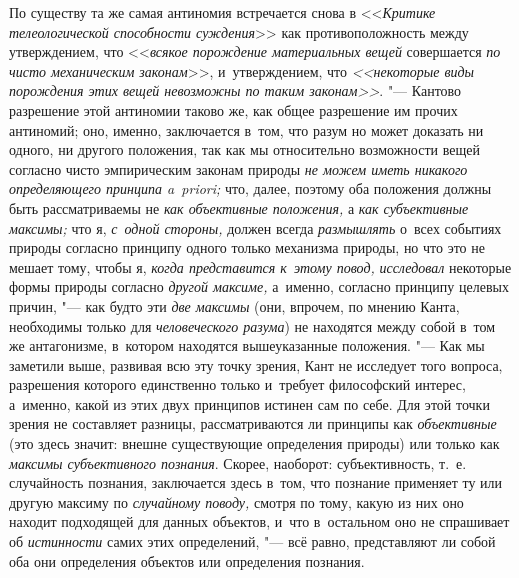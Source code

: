 По существу та же самая антиномия встречается снова в <<{\em Критике
телеологической способности суждения}>> как противоположность между
утверждением, что <<{\em всякое порождение материальных вещей} совершается
{\em по чисто механическим законам}>>, и~утверждением, что
{\em <<некоторые виды порождения этих вещей невозможны по таким
законам>>}.
"--- Кантово разрешение этой антиномии таково же, как общее
разрешение им прочих антиномий; оно, именно, заключается в~том, что разум
но может доказать ни одного, ни другого положения, так как мы относительно
возможности вещей согласно чисто эмпирическим законам природы
{\em не можем иметь никакого
определяющего принципа a~priori;} что, далее, поэтому оба
положения должны быть рассматриваемы не
{\em как объективные положения,} а {\em как субъективные
максимы;} что я, {\em с~одной стороны,} должен всегда {\em размышлять} о~всех
событиях природы согласно принципу одного только механизма природы, но что
это не мешает тому, чтобы я, {\em когда представится к~этому повод,}
{\em исследовал} некоторые формы природы согласно {\em другой
максиме,} а~именно, согласно принципу целевых причин, "--- как будто эти
{\em две максимы} (они, впрочем, по мнению Канта, необходимы только
для {\em человеческого разума})
не находятся между собой в~том же антагонизме, в~котором
находятся вышеуказанные положения. "--- Как мы заметили выше,
развивая всю эту точку зрения, Кант не исследует того вопроса, разрешения
которого единственно только и~требует философский интерес, а~именно, какой
из этих двух принципов истинен сам по себе. Для этой точки зрения не
составляет разницы, рассматриваются ли принципы как {\em объективные} (это
здесь значит: внешне существующие определения природы) или только как
{\em максимы субъективного познания}.
Скорее, наоборот: субъективность, т.~е. случайность познания,
заключается здесь в~том, что познание применяет ту или другую максиму по
{\em случайному поводу,} смотря по тому, какую из них оно находит подходящей
для данных объектов, и~что в~остальном оно не спрашивает об {\em истинности}
самих этих определений, "--- всё равно, представляют ли собой оба они
определения объектов или определения познания.

